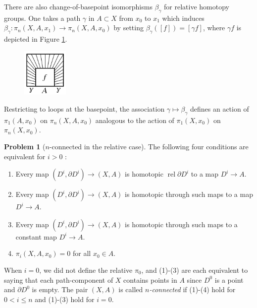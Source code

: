 \documentclass[reqno]{amsart}
\theoremstyle{definition}
\newtheorem{problem}[theorem]{Problem}
\theoremstyle{remark}
\DeclareMathOperator{\rel}{rel}
\begin{document}
There are also change-of-basepoint isomorphisms
$\beta_{\gamma}$ for relative homotopy groups.
One takes a path  $\gamma$ in $A \subset X$ from
$x_0$ to $x_1$ which induces
$\beta_{\gamma} \colon \pi_n (X,A,x_1) \to 
\pi_n (X,A,x_0)$ by setting
$\beta_{\gamma} \left( \left[ f \right]  \right) 
= \left[ \gamma f \right] $, where
$\gamma f$ is depicted in 
Figure \ref{fig:DIWIOA-png}.

\begin{figure}[htpb]
    \centering
    \includegraphics[width=0.2\textwidth]{Figures/DIWIOA.png}
    \caption{}
    \label{fig:DIWIOA-png}
\end{figure}

Restricting to loops at the
basepoint, the association $\gamma \mapsto 
\beta_{\gamma}$ defines an action
of $\pi_1 \left( A, x_0 \right) $ on
$\pi_n \left( X, A, x_0 \right) $ analogous to the
action of $\pi_1 \left( X, x_0 \right) $ on
$\pi_n (X,x_0)$.










\begin{problem}[$n$-connected in the relative case]\label{n-connected-relative}
    The following four conditions are equivalent for
    $i>0$ :
    \begin{enumerate}
        \item Every map
            $\left( D^{i} , \partial D^{i} \right) \to 
            \left( X,A \right) $ is homotopic
            $\rel \partial D^{i}$ to a map $D^{i} \to A$.
        \item Every map $\left( D^{i},\partial D^{i} \right) 
            \to (X,A)$ is homotopic through such maps
            to a map $D^{i} \to A$.
        \item Every map $\left( D^{i}, \partial D^{i} \right) 
            \to \left( X,A \right) $ is homotopic through such
            maps to a constant map $D^{i} \to A$.
        \item $\pi_i \left( X, A, x_0 \right) = 0$ for all
            $x_0 \in A$.
    \end{enumerate}
    When $i = 0$, we did not define the relative $\pi_0$,
    and (1)-(3) are each equivalent to saying that
    each path-component of $X$ contains points
    in $A$ since $D^{0}$ is a point and
    $\partial D^{0}$ is empty. The pair
    $\left( X, A \right) $ is called \textit{$n$-connected}
    if (1)-(4) hold for $0<i\le n$ and
    (1)-(3) hold for  $i=0$.
\end{problem}
\end{document}
